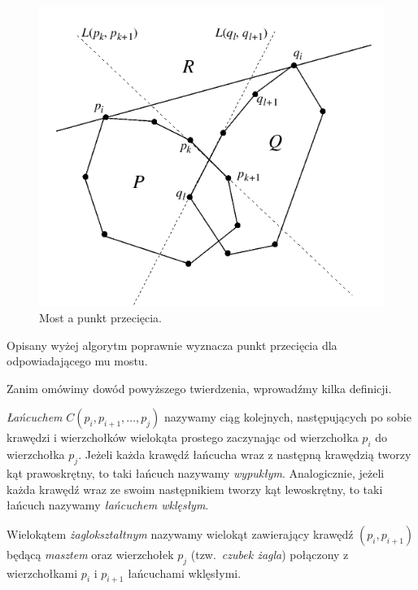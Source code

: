 \begin{figure}[htb]
  \centering
  \includegraphics[scale=0.7]{img/toussaint2}
  \caption{\label{img:toussaint2} Most a punkt przecięcia.}
\end{figure}

\begin{twierdzenie}
  Opisany wyżej algorytm poprawnie wyznacza punkt przecięcia dla
  odpowiadającego mu mostu.
\end{twierdzenie}

Zanim omówimy dowód powyższego twierdzenia, wprowadźmy kilka
definicji.

\begin{definicja}
  \emph{Łańcuchem} $C(p_i,p_{i+1},\ldots,p_j)$ nazywamy ciąg
  kolejnych, następujących po sobie krawędzi i wierzchołków wielokąta
  prostego zaczynając od wierzchołka $p_i$ do wierzchołka
  $p_j$. Jeżeli każda krawędź łańcucha wraz z następną krawędzią
  tworzy kąt prawoskrętny, to taki łańcuch nazywamy
  \emph{wypukłym}. Analogicznie, jeżeli każda krawędź wraz ze swoim
  następnikiem tworzy kąt lewoskrętny, to taki łańcuch nazywamy
  \emph{łańcuchem wklęsłym}.
\end{definicja}

\begin{definicja}
  Wielokątem \emph{żaglokształtnym} nazywamy wielokąt zawierający
  krawędź $(p_{i},p_{i+1})$ będącą \emph{masztem} oraz wierzchołek
  $p_j$ (tzw.\ \emph{czubek żagla}) połączony z wierzchołkami $p_i$ i
  $p_{i+1}$ łańcuchami wklęsłymi.
\end{definicja}

